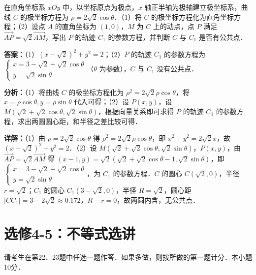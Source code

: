 \begin{question}[points=10]
在直角坐标系 $xOy$ 中，以坐标原点为极点，$x$ 轴正半轴为极轴建立极坐标系，曲线 $C$ 的极坐标方程为 $\rho = 2\sqrt{2}\cos\theta$．（1）将 $C$ 的极坐标方程化为直角坐标方程；（2）设点 $A$ 的直角坐标为 $(1,0)$，$M$ 为 $C$ 上的动点，点 $P$ 满足 $\overrightarrow{AP} = \sqrt{2}\overrightarrow{AM}$，写出 $P$ 的轨迹 $C_1$ 的参数方程，并判断 $C$ 与 $C_1$ 是否有公共点．
\begin{solution}
\textbf{答案：}（1）$(x-\sqrt{2})^2+y^2=2$；（2）$P$ 的轨迹 $C_1$ 的参数方程为 $\begin{cases} x = 3-\sqrt{2}+\sqrt{2}\cos\theta \\ y = \sqrt{2}\sin\theta \end{cases}$（$\theta$ 为参数），$C$ 与 $C_1$ 没有公共点．

\textbf{分析：}（1）将曲线 $C$ 的极坐标方程化为 $\rho^2 = 2\sqrt{2}\rho\cos\theta$，将 $x=\rho\cos\theta, y=\rho\sin\theta$ 代入可得；（2）设 $P(x,y)$，设 $M(\sqrt{2}+\sqrt{2}\cos\theta, \sqrt{2}\sin\theta)$，根据向量关系即可求得 $P$ 的轨迹 $C_1$ 的参数方程，求出两圆圆心距，和半径之差比较可得．

\textbf{详解：}（1）由 $\rho=2\sqrt{2}\cos\theta$ 得 $\rho^2=2\sqrt{2}\rho\cos\theta$，即 $x^2+y^2=2\sqrt{2}x$，故 $(x-\sqrt{2})^2+y^2=2$．（2）设 $M(\sqrt{2}+\sqrt{2}\cos\theta, \sqrt{2}\sin\theta)$，$P(x,y)$，由 $\overrightarrow{AP}=\sqrt{2}\overrightarrow{AM}$ 得 $(x-1,y)=\sqrt{2}(\sqrt{2}+\sqrt{2}\cos\theta-1, \sqrt{2}\sin\theta)$，即 $\begin{cases} x = 3-\sqrt{2}+\sqrt{2}\cos\theta \\ y = \sqrt{2}\sin\theta \end{cases}$，为 $C_1$ 的参数方程．$C$ 的圆心 $C(\sqrt{2},0)$，半径 $r=\sqrt{2}$；$C_1$ 的圆心 $C_1(3-\sqrt{2},0)$，半径 $R=\sqrt{2}$，圆心距 $|CC_1| = 3-2\sqrt{2} \approx 0.172$，$R-r = 0$，故两圆内含，无公共点．
\end{solution}
\end{question}

\section*{选修4-5：不等式选讲}
请考生在第22、23题中任选一题作答．如果多做，则按所做的第一题计分．本小题10分．

